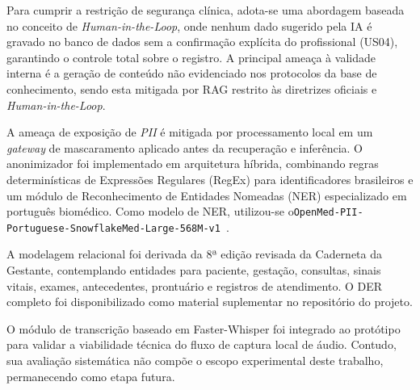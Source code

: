 Para cumprir a restrição de segurança clínica, adota-se uma abordagem baseada no conceito de \textit{Human-in-the-Loop}, onde nenhum dado sugerido pela IA é gravado no banco de dados sem a confirmação explícita do profissional (US04), garantindo o controle total sobre o registro.
A principal ameaça à validade interna é a geração de conteúdo não evidenciado nos protocolos da base de conhecimento, sendo esta mitigada por RAG restrito às diretrizes oficiais e \textit{Human-in-the-Loop}.

A ameaça de exposição de \textit{PII} é mitigada por processamento local em um \textit{gateway} de mascaramento aplicado antes da recuperação e inferência.
O anonimizador foi implementado em arquitetura híbrida, combinando regras determinísticas de Expressões Regulares (RegEx) para identificadores brasileiros e um módulo de Reconhecimento de Entidades Nomeadas (NER) especializado em português biomédico.
Como modelo de NER, utilizou-se o\linebreak \texttt{OpenMed-PII-Portuguese-SnowflakeMed-Large-568M-v1}~\cite{openmed-pii-2026}.%

A modelagem relacional foi derivada da 8ª edição revisada da Caderneta da Gestante, contemplando entidades para paciente, gestação, consultas, sinais vitais, exames, antecedentes, prontuário e registros de atendimento.
O DER completo foi disponibilizado como material suplementar no repositório do projeto.

O módulo de transcrição baseado em Faster-Whisper foi integrado ao protótipo para validar a viabilidade técnica do fluxo de captura local de áudio. Contudo, sua avaliação sistemática não compõe o escopo experimental deste trabalho, permanecendo como etapa futura.